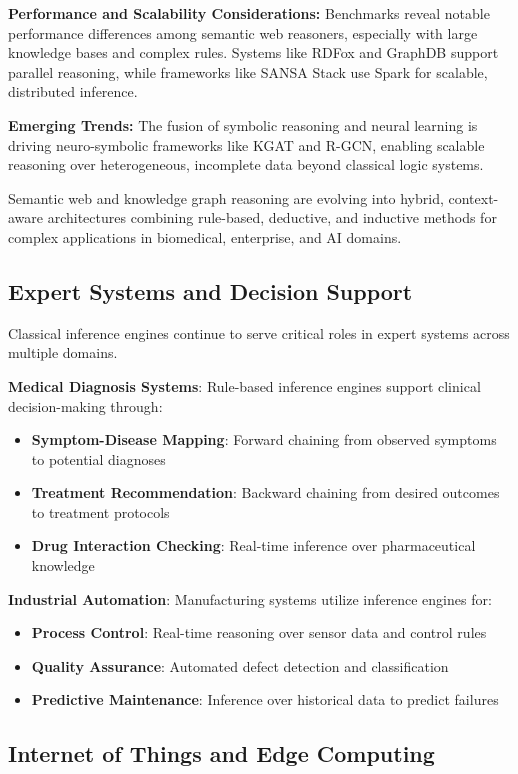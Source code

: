 \documentclass[12pt,a4paper]{article}
\begin{document}
\textbf{Performance and Scalability Considerations:} Benchmarks reveal notable performance differences among semantic web reasoners, especially with large knowledge bases and complex rules. Systems like RDFox and GraphDB support parallel reasoning, while frameworks like SANSA Stack use Spark for scalable, distributed inference.

\textbf{Emerging Trends:} The fusion of symbolic reasoning and neural learning is driving neuro-symbolic frameworks like KGAT and R-GCN, enabling scalable reasoning over heterogeneous, incomplete data beyond classical logic systems. 

Semantic web and knowledge graph reasoning are evolving into hybrid, context-aware architectures combining rule-based, deductive, and inductive methods for complex applications in biomedical, enterprise, and AI domains.

\subsection{Expert Systems and Decision Support}
Classical inference engines continue to serve critical roles in expert systems across multiple domains.

\textbf{Medical Diagnosis Systems}: Rule-based inference engines support clinical decision-making through:
\begin{itemize}
    \item \textbf{Symptom-Disease Mapping}: Forward chaining from observed symptoms to potential diagnoses
    \item \textbf{Treatment Recommendation}: Backward chaining from desired outcomes to treatment protocols
    \item \textbf{Drug Interaction Checking}: Real-time inference over pharmaceutical knowledge
\end{itemize}

\textbf{Industrial Automation}: Manufacturing systems utilize inference engines for:
\begin{itemize}
    \item \textbf{Process Control}: Real-time reasoning over sensor data and control rules
    \item \textbf{Quality Assurance}: Automated defect detection and classification
    \item \textbf{Predictive Maintenance}: Inference over historical data to predict failures
\end{itemize}

\subsection{Internet of Things and Edge Computing}
\end{document}
